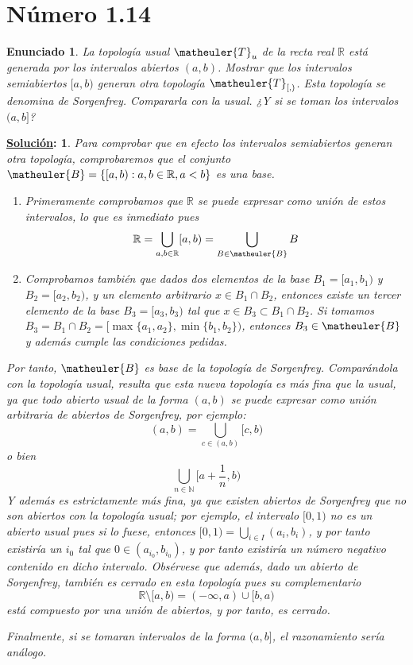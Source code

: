\documentclass[10pt,a4paper,openright]{book}
\theoremstyle{break}
\newtheorem*{enun}{Enunciado}
\newtheorem*{sol}{\underline{Solución}:}
\begin{document}
\section*{Número 1.14}
\begin{enun}
La topología \textit{usual} $\matheuler{T}_u$ de la recta real $\mathbb{R}$ está generada por los intervalos abiertos $(a,b)$. Mostrar que los intervalos semiabiertos $[a,b)$ generan otra topología $\matheuler{T}_{[,)}$. Esta topología se denomina de \textit{Sorgenfrey}. Compararla con la usual. ¿Y si se toman los intervalos $(a,b]$?
\end{enun}
\begin{sol}
Para comprobar que en efecto los intervalos semiabiertos generan otra topología, comprobaremos que el conjunto $\matheuler{B} = \{[a,b) : a,b \in \mathbb{R}, a < b\}$ es una base.
\begin{enumerate}[label={(\arabic*)}]
\item Primeramente comprobamos que $\mathbb{R}$ se puede expresar como unión de estos intervalos, lo que es inmediato pues 
$$\mathbb{R} = \bigcup_{a,b \in \mathbb{R}} [a,b) = \bigcup_{B \in \matheuler{B}} B$$
\item Comprobamos también que dados dos elementos de la base $B_1 = [a_1, b_1)$ y $B_2 = [a_2,b_2)$, y un elemento arbitrario $x \in B_1 \cap B_2$, entonces existe un tercer elemento de la base $B_3 = [a_3,b_3)$ tal que $x \in B_3 \subset B_1 \cap B_2$. Si tomamos $B_3 = B_1 \cap B_2 = [\max\{a_1,a_2\}, \min\{b_1,b_2\})$, entonces $B_3 \in \matheuler{B}$ y además cumple las condiciones pedidas.
\end{enumerate}
Por tanto, $\matheuler{B}$ es base de la topología de Sorgenfrey. Comparándola con la topología usual, resulta que esta nueva topología es  más fina que la usual, ya que todo abierto usual de la forma $(a,b)$ se puede expresar como unión arbitraria de abiertos de Sorgenfrey, por ejemplo: $$(a,b) = \bigcup_{c \in (a,b)} [c,b)$$ o bien $$\bigcup_{n \in \mathbb{N}} [a + \frac{1}{n}, b)$$ Y además es estrictamente más fina, ya que existen abiertos de Sorgenfrey que no son abiertos con la topología usual; por ejemplo, el intervalo $[0,1)$ no es un abierto usual pues si lo fuese, entonces $[0,1) = \bigcup_{i \in I} (a_i,b_i)$, y por tanto existiría un $i_0$ tal que $0 \in (a_{i_0},b_{i_0})$, y por tanto existiría un número negativo contenido en dicho intervalo. Obsérvese que además, dado un abierto de Sorgenfrey, también es cerrado en esta topología pues su complementario $$\mathbb{R} \setminus [a,b) = (-\infty,a) \cup [b,a)$$ está compuesto por una unión de abiertos, y por tanto, es cerrado.

Finalmente, si se tomaran intervalos de la forma $(a,b]$, el razonamiento sería análogo.
\end{sol}
\end{document}
